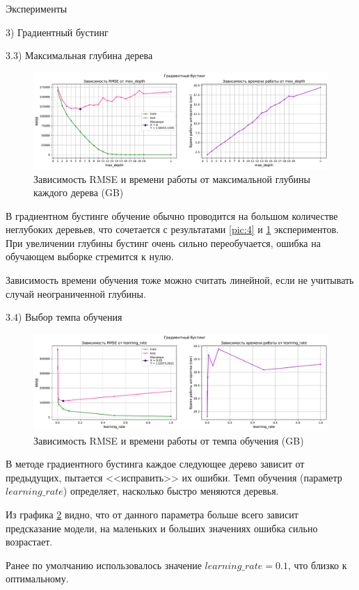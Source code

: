 \documentclass[a4paper,12pt,titlepage,finall]{article}
\begin{document}
\begin{section}{Эксперименты}
\begin{subsection}{3) Градиентный бустинг}
\begin{subsubsection}{3.3) Максимальная глубина дерева}
\begin{figure}[H]
	\includegraphics[scale=0.9, width=17cm]{G_3.pdf}
	\centering
	\caption{Зависимость RMSE и времени работы от максимальной глубины каждого дерева (GB)}
	\label{pic:6}
\end{figure}

В градиентном бустинге обучение обычно проводится на большом количестве неглубоких деревьев, что сочетается с результатами \ref{pic:4} и \ref{pic:6} экспериментов. При увеличении глубины бустинг очень сильно переобучается, ошибка на обучающем выборке стремится к нулю. \par 
Зависимость времени обучения тоже можно считать линейной, если не учитывать случай неограниченной глубины.
\end{subsubsection}

\begin{subsubsection}{3.4) Выбор темпа обучения}
\begin{figure}[H]
	\includegraphics[scale=0.9, width=17cm]{G_4.pdf}
	\centering
	\caption{Зависимость RMSE и времени работы от темпа обучения (GB)}
	\label{pic:7}
\end{figure}
В методе градиентного бустинга каждое следующее дерево зависит от предыдущих, пытается <<исправить>> их ошибки. Темп обучения (параметр $learning\_rate$) определяет, насколько быстро меняются деревья. \par  
Из графика \ref{pic:7} видно, что от данного параметра больше всего зависит предсказание модели, на маленьких и больших значениях ошибка сильно возрастает. \par  Ранее по умолчанию использовалось значение $learning\_rate = 0.1$, что близко к оптимальному.


\end{subsubsection}
\end{subsection}
\end{section}
\end{document}
